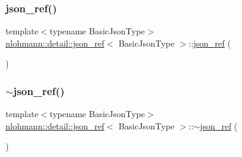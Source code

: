 \mbox{\label{classnlohmann_1_1detail_1_1json__ref_a4c68db46934e03588bbd73b00147c0dd}} 
\subsubsection{\texorpdfstring{json\_ref()}{json\_ref()}\hspace{0.1cm}{\footnotesize\ttfamily [6/6]}}
{\footnotesize\ttfamily template$<$typename Basic\+Json\+Type$>$ \\
\mbox{\hyperlink{classnlohmann_1_1detail_1_1json__ref}{nlohmann\+::detail\+::json\+\_\+ref}}$<$ Basic\+Json\+Type $>$\+::\mbox{\hyperlink{classnlohmann_1_1detail_1_1json__ref}{json\+\_\+ref}} (\begin{DoxyParamCaption}\item[{const \mbox{\hyperlink{classnlohmann_1_1detail_1_1json__ref}{json\+\_\+ref}}$<$ Basic\+Json\+Type $>$ \&}]{ }\end{DoxyParamCaption})\hspace{0.3cm}{\ttfamily [delete]}}

\mbox{\label{classnlohmann_1_1detail_1_1json__ref_a8bcd4cfcafe952ce5140f8cb35ebe2f6}} 
\subsubsection{\texorpdfstring{$\sim$json\_ref()}{~json\_ref()}}
{\footnotesize\ttfamily template$<$typename Basic\+Json\+Type$>$ \\
\mbox{\hyperlink{classnlohmann_1_1detail_1_1json__ref}{nlohmann\+::detail\+::json\+\_\+ref}}$<$ Basic\+Json\+Type $>$\+::$\sim$\mbox{\hyperlink{classnlohmann_1_1detail_1_1json__ref}{json\+\_\+ref}} (\begin{DoxyParamCaption}{ }\end{DoxyParamCaption})\hspace{0.3cm}{\ttfamily [default]}}



